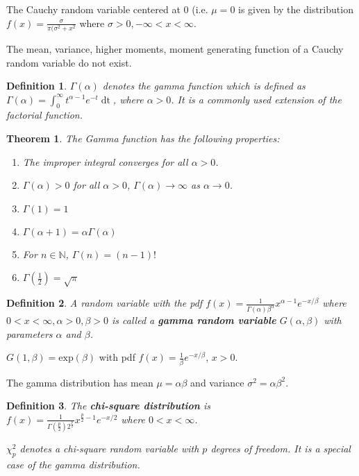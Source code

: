 \documentclass[12pt,twoside]{report}
\newtheorem{defn}{Definition}
\newtheorem{thm}{Theorem}
\begin{document}
The Cauchy random variable centered at $0$ (i.e. $\mu = 0$ is given by the distribution $f(x) = \displaystyle \frac{\sigma}{\pi ( \sigma^2 + x^2}$ where $\sigma > 0, -\infty < x < \infty$.

The mean, variance, higher moments, moment generating function of a Cauchy random variable do not exist.

\begin{defn}
    $\Gamma(\alpha)$ denotes the gamma function which is defined as $\Gamma(\alpha) = \displaystyle\int_0^\infty t ^{\alpha - 1} e ^{-t} \mathop{\mathrm{d} t}$, where $\alpha > 0$. It is a commonly used extension of the factorial function.
\end{defn}

\begin{thm}
    The Gamma function has the following properties:
    \begin{enumerate}
        \item The improper integral converges for all $\alpha > 0$.
        \item $\Gamma(\alpha) > 0$  for all $\alpha > 0$, $\Gamma(\alpha) \to \infty$ as $\alpha \to 0$.
        \item $\Gamma(1) = 1$
        \item $\Gamma(\alpha + 1) = \alpha \Gamma(\alpha)$
        \item For $n \in \mathbb{N}$, $\Gamma(n) = (n-1)!$
        \item $\Gamma(\frac{1}{2}) = \sqrt{\pi}$
    \end{enumerate}
\end{thm}

\begin{defn}
    A random variable with the pdf $f(x) = \displaystyle  \frac{1}{\Gamma(\alpha) \beta^\alpha} x^{\alpha - 1} e^{-x/\beta}$ where $0 < x < \infty, \alpha > 0, \beta > 0$ is called a \textbf{gamma random variable} $G(\alpha, \beta)$ with parameters $\alpha$ and $\beta$.
\end{defn}
$G(1, \beta) = \text{exp}(\beta)$ with pdf $f(x) = \frac{1}{\beta} e^{-x/\beta}$, $x > 0$.

The gamma distribution has mean $\mu = \alpha \beta$ and variance $\sigma^2 = \alpha \beta^2$.

\begin{defn}
    The \textbf{chi-square distribution} is \\
    $f(x) = \displaystyle \frac{1}{\Gamma(\frac{p}{2}) 2^{\frac{p}{2}}} x^{\frac{p}{2} - 1} e ^{-x/2}$ where $0 < x < \infty$.

    \vspace{0.5cm}
    $\chi_p^2$ denotes a chi-square random variable with $p$ degrees of freedom. It is a special case of the gamma distribution.
\end{defn}
\end{document}
